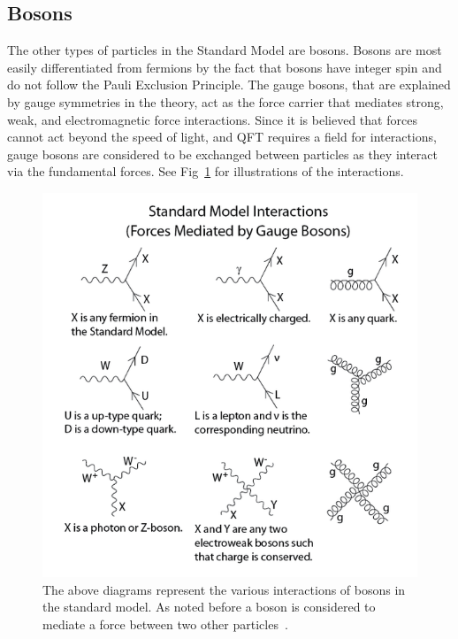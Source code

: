 \subsection{Bosons}
 The other types of particles in the Standard Model are bosons. Bosons are most easily differentiated from fermions by the fact that bosons have integer spin and do not follow the Pauli Exclusion Principle. The gauge bosons, that are explained by gauge symmetries in the theory, act as the force carrier that mediates strong, weak, and electromagnetic force interactions. Since it is believed that forces cannot act beyond the speed of light, and QFT requires a field for interactions, gauge bosons are considered to be exchanged between particles as they interact via the fundamental forces. See Fig~\ref{fig:sm_force_mediation} for illustrations of the interactions. 
  \begin{figure}[h]
\begin{center}
\includegraphics[width=0.8\linewidth]{Figs/SM_force_mediation.png}
\caption{\label{fig:sm_force_mediation}
 The above diagrams represent the various interactions of bosons in the standard model. As noted before a boson is considered to mediate a force between two other particles~\cite{wikimediations}.
}
\end{center}
\end{figure}
 
 \pagebreak
 
